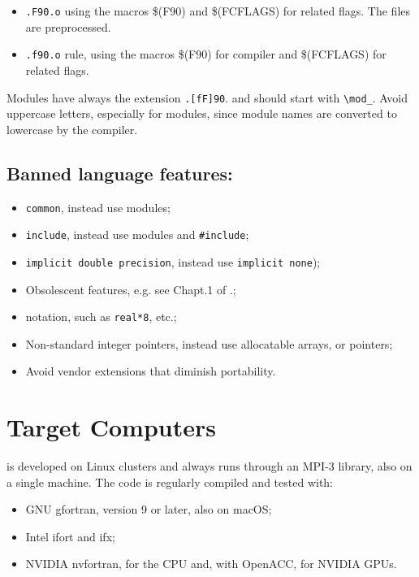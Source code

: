  \begin{itemize}
 \item
  \verb=.F90.o=  using the macros {\macro \$(F90)} and 
{\macro \$(FCFLAGS)} for related flags. The files are preprocessed.
 \item
  \verb=.f90.o= rule, using the macros {\macro \$(F90)} for compiler and 
{\macro \$(FCFLAGS)} for related flags.
 \end{itemize}

Modules have always the extension \verb=.[fF]90=. and should start with \verb=\mod_=.
Avoid uppercase letters, especially for modules, since module names
are converted to lowercase by the compiler.
 
\subsection{ Banned \oldfort language features:}

 \begin{itemize}
 \item {\tt common}, instead use modules;
 \item {\tt include}, instead use modules and \verb=#include=;
 \item {\tt implicit double precision}, instead use {\tt implicit none});
 \item  Obsolescent \oldfort features, e.g. see Chapt.1 of \cite{Kerrigan}.;
 \item \oldfort notation, such as \verb=real*8=, etc.;
 \item  Non-standard \oldfort integer pointers, instead use allocatable
   arrays, or \fort pointers;
 \item  Avoid vendor extensions that diminish portability.
 \end{itemize}


\section{Target Computers}

\PR is developed on Linux clusters and always runs through an MPI-3
library, also on a single machine. The code is regularly compiled and tested
with:

\begin{itemize}
\item GNU gfortran, version 9 or later, also on macOS;
\item Intel ifort and ifx;
\item NVIDIA nvfortran, for the CPU and, with OpenACC, for NVIDIA GPUs.
\end{itemize}

